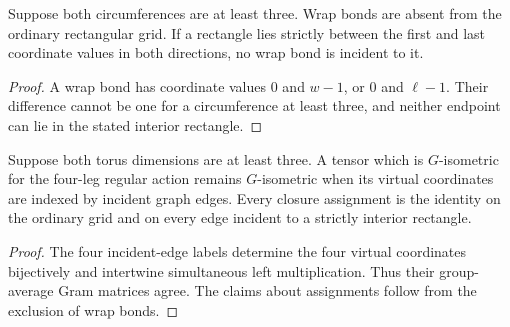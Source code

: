 





\begin{lemma}%
    \label{thm:peps_torus_interior_rectangle_seam_exclusion}
    \leanok
    Suppose both circumferences are at least three. Wrap bonds are absent
    from the ordinary rectangular grid. If a rectangle lies strictly
    between the first and last coordinate values in both directions,
    no wrap bond is incident to it.
\end{lemma}

\begin{proof}\leanok
    A wrap bond has coordinate values $0$ and $w-1$, or $0$ and $\ell-1$.
    Their difference cannot be one for a circumference at least three,
    and neither endpoint can lie in the stated interior rectangle.
\end{proof}

\begin{lemma}%
    \label{thm:peps_regular_torus_incident_isometry}
    \leanok
    Suppose both torus dimensions are at least three. A tensor which is
    $G$-isometric for the four-leg regular action remains $G$-isometric
    when its virtual coordinates are indexed by incident graph edges.
    Every closure assignment is the identity on the ordinary grid and
    on every edge incident to a strictly interior rectangle.
\end{lemma}

\begin{proof}\leanok
    The four incident-edge labels determine the four virtual coordinates
    bijectively and intertwine simultaneous left multiplication. Thus
    their group-average Gram matrices agree. The claims about assignments
    follow from the exclusion of wrap bonds.
\end{proof}

